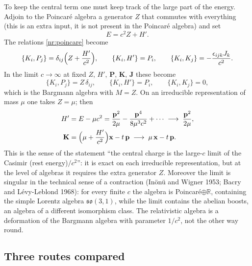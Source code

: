 To keep the central term one must keep track of the large part of the
energy. Adjoin to the Poincar\'e algebra a generator $Z$ that commutes with
everything (this is an extra input, it is not present in the Poincar\'e algebra)
and set
\begin{equation}
  E=c^2Z+H' .
  \label{nr:Esplit}
\end{equation}
The relations \eqref{nr:poincare} become
\begin{equation}
  \{K_i,P_j\}=\delta_{ij}\Bigl(Z+\frac{H'}{c^2}\Bigr),\qquad
  \{K_i,H'\}=P_i,\qquad
  \{K_i,K_j\}=-\frac{\epsilon_{ijk}J_k}{c^2}.
  \label{nr:contraction}
\end{equation}
In the limit $c\to\infty$ at fixed $Z$, $H'$, $\mathbf{P}$, $\mathbf{K}$, $\mathbf{J}$ these become
\begin{equation}
  \{K_i,P_j\}=Z\,\delta_{ij},\qquad \{K_i,H'\}=P_i,\qquad \{K_i,K_j\}=0 ,
  \label{nr:contractionlimit}
\end{equation}
which is the Bargmann algebra with $M=Z$. On an irreducible representation
of mass $\mu$ one takes $Z=\mu$; then
\begin{equation}
  \begin{aligned}
  H'&=E-\mu c^2=\frac{\mathbf{p}^2}{2\mu}-\frac{\mathbf{p}^4}{8\mu^3c^2}+\cdots
     \;\longrightarrow\;\frac{\mathbf{p}^2}{2\mu},\\
  \mathbf{K}&=\Bigl(\mu+\frac{H'}{c^2}\Bigr)\mathbf{x}-t\,\mathbf{p}
     \;\longrightarrow\;\mu\,\mathbf{x}-t\,\mathbf{p}.
  \end{aligned}
  \label{nr:expansion}
\end{equation}
This is the sense of the statement ``the central charge is the large-$c$ limit
of the Casimir (rest energy)$/c^2$'': it is exact on each irreducible
representation, but at the level of algebras it requires the extra generator
$Z$. Moreover the limit is singular in the technical sense of a
contraction (In\"on\"u and Wigner 1953; Bacry and L\'evy-Leblond 1968): for every
finite $c$ the algebra is Poincar\'e$\oplus\mathbb{R}$, containing the
simple Lorentz algebra $\mathfrak{so}(3,1)$, while the limit contains the
abelian boosts, an algebra of a different isomorphism class. The relativistic
algebra is a deformation of the Bargmann algebra with parameter $1/c^2$, not
the other way round.

\subsection{Three routes compared}

